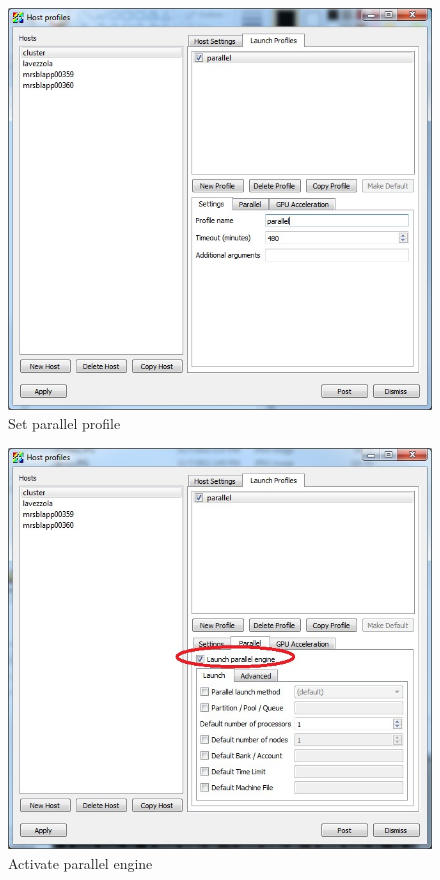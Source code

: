 \documentclass[12pt]{report}
\begin{document}
        \begin{figure}
        \begin{center}
        \includegraphics{setHostProfileParallel1}
        \caption{Set parallel profile}
        \label{figure:setHostProfileParallel1}
        \end{center}
        \end{figure}


        \begin{figure}
        \begin{center}
        \includegraphics{setHostProfileParallel2}
        \caption{Activate parallel engine}
        \label{figure:setHostProfileParallel2}
        \end{center}
        \end{figure}
\end{document}
